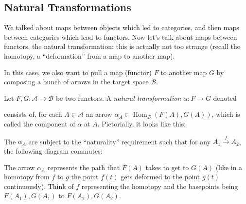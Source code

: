 \subsection{Natural Transformations}
We talked about maps between objects which led to categories, and then maps between categories which lead to functors. Now let's talk about maps between functors, the natural transformation: this is actually not too strange (recall the homotopy, a ``deformation'' from a map to another map).

In this case, we also want to pull a map (functor) $F$ to another map $G$ by composing a bunch of arrows in the target space $\mathcal{B}$.
\newpage
\begin{definition}
    Let $F,G \colon \mathcal{A} \to \mathcal{B}$ be two functors. A \emph{natural transformation} $\alpha \colon F \to G$ denoted
            \begin{figure}[H]
                \centering
            \end{figure}
            consists of, for each $A\in \mathcal{A}$ an arrow $\alpha_A \in \operatorname{Hom}_{\mathcal{B}}(F(A),G(A))$, which is called the component of $\alpha$ at $A$. 
            Pictorially, it looks like this: 
            \begin{figure}[H]
                \centering
            \end{figure}
            The $\alpha_A$ are subject to the ``naturality'' requirement such that for any $A_1 \overset{f}{\to }A_2$, the following diagram commutes:
            \begin{figure}[H]
                \centering
            \end{figure}
            The arrow $\alpha_A$ represents the path that $F(A)$ takes to get to $G(A)$ (like in a homotopy from $f$ to $g$ the point $f(t)$ gets deformed to the point $g(t)$ continuously). Think of $f$ representing the homotopy and the basepoints being $F(A_1),G(A_1)$ to $F(A_2),G(A_2)$.
\end{definition}

